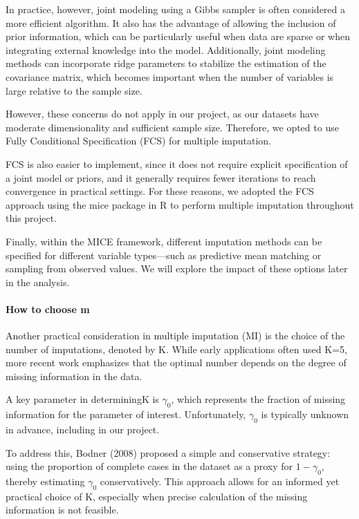\documentclass{article}
\begin{document}
In practice, however, joint modeling using a Gibbs sampler is often
considered a more efficient algorithm. It also has the advantage of
allowing the inclusion of prior information, which can be particularly
useful when data are sparse or when integrating external knowledge into
the model. Additionally, joint modeling methods can incorporate ridge
parameters to stabilize the estimation of the covariance matrix, which
becomes important when the number of variables is large relative to the
sample size.

However, these concerns do not apply in our project, as our datasets
have moderate dimensionality and sufficient sample size. Therefore, we
opted to use Fully Conditional Specification (FCS) for multiple
imputation.

FCS is also easier to implement, since it does not require explicit
specification of a joint model or priors, and it generally requires
fewer iterations to reach convergence in practical settings. For these
reasons, we adopted the FCS approach using the mice package in R to
perform multiple imputation throughout this project.

Finally, within the MICE framework, different imputation methods can be
specified for different variable types---such as predictive mean
matching or sampling from observed values. We will explore the impact of
these options later in the analysis.

\paragraph{How to choose m}\label{how-to-choose-m}

Another practical consideration in multiple imputation (MI) is the
choice of the number of imputations, denoted by K. While early
applications often used K=5, more recent work emphasizes that the
optimal number depends on the degree of missing information in the data.

A key parameter in determiningK is \(\gamma_{0}\), which represents the
fraction of missing information for the parameter of interest.
Unfortunately, \(\gamma_{0}\) is typically unknown in advance, including
in our project.

To address this, Bodner (2008) proposed a simple and conservative
strategy: using the proportion of complete cases in the dataset as a
proxy for \(1-\gamma_{0}\), thereby estimating \(\gamma_{0}\)
conservatively. This approach allows for an informed yet practical
choice of K, especially when precise calculation of the missing
information is not feasible.
\end{document}
